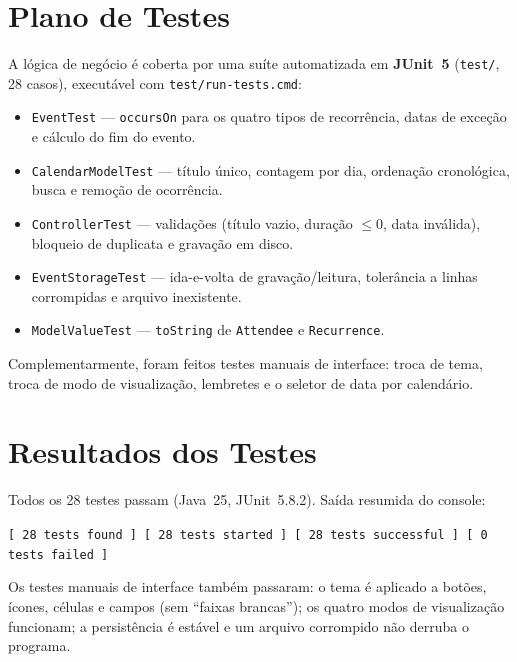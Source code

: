 \documentclass[10pt,a4paper]{article}
\begin{document}
\section{Plano de Testes}
A lógica de negócio é coberta por uma suíte automatizada em \textbf{JUnit~5}
(\texttt{test/}, 28 casos), executável com \texttt{test/run-tests.cmd}:
\begin{itemize}
  \item \texttt{EventTest} — \texttt{occursOn} para os quatro tipos de recorrência,
        datas de exceção e cálculo do fim do evento.
  \item \texttt{CalendarModelTest} — título único, contagem por dia, ordenação
        cronológica, busca e remoção de ocorrência.
  \item \texttt{ControllerTest} — validações (título vazio, duração $\le 0$, data
        inválida), bloqueio de duplicata e gravação em disco.
  \item \texttt{EventStorageTest} — ida-e-volta de gravação/leitura, tolerância a
        linhas corrompidas e arquivo inexistente.
  \item \texttt{ModelValueTest} — \texttt{toString} de \texttt{Attendee} e
        \texttt{Recurrence}.
\end{itemize}
Complementarmente, foram feitos testes manuais de interface: troca de tema, troca de
modo de visualização, lembretes e o seletor de data por calendário.

\section{Resultados dos Testes}
Todos os 28 testes passam (Java~25, JUnit~5.8.2). Saída resumida do console:
\begin{center}\small
\texttt{[\ 28 tests found\ ] [\ 28 tests started\ ] [\ 28 tests successful\ ] [\ 0 tests failed\ ]}
\end{center}
Os testes manuais de interface também passaram: o tema é aplicado a botões, ícones,
células e campos (sem ``faixas brancas''); os quatro modos de visualização funcionam;
a persistência é estável e um arquivo corrompido não derruba o programa.

\end{document}
